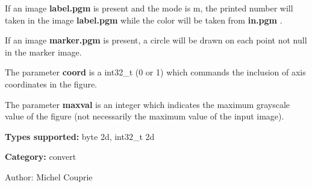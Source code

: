 If an image {\bf label.pgm} is present and the mode is m, the printed number will taken in the image {\bf label.pgm} while the color will be taken from {\bf in.pgm} .

If an image {\bf marker.pgm} is present, a circle will be drawn on each point not null in the marker image.

The parameter {\bf coord} is a int32\_\-t (0 or 1) which commands the inclusion of axis coordinates in the figure.

The parameter {\bf maxval} is an integer which indicates the maximum grayscale value of the figure (not necessarily the maximum value of the input image).

{\bf Types supported:} byte 2d, int32\_\-t 2d

{\bf Category:} convert

\begin{Desc}
\item[Author:]Michel Couprie \end{Desc}
